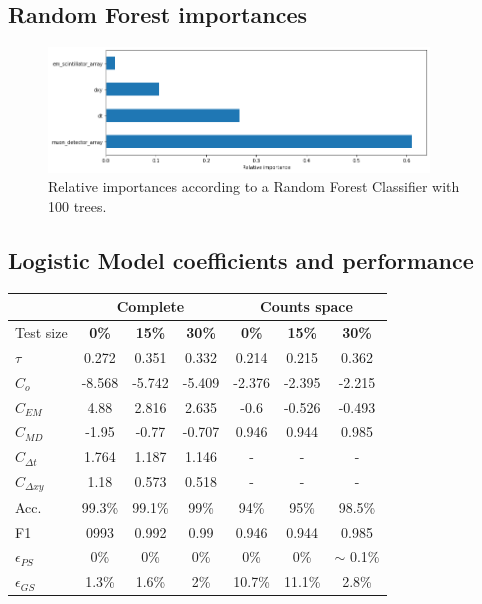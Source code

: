\documentclass{article}
\begin{document}
\begin{appendices}
\subsection{Random Forest importances}
\begin{figure}[!h]
    \centering
    \includegraphics[width=0.9\textwidth]{imgs/importRF.png}
    \caption{Relative importances according to a Random Forest Classifier with 100 trees.}
    \label{fig:importances}
\end{figure}

\subsection{Logistic Model coefficients and performance}
\begin{table}[!h]
\centering
\begin{tabular}[]{l|ccc|ccc}
\hline
  & \multicolumn{3}{c}{Complete}  & \multicolumn{3}{c}{Counts space} \tabularnewline
\hline
Test size    & \textbf{0\%} &\textbf{15\%} & \textbf{30\%} & \textbf{0\%} & \textbf{15\%} &\textbf{30\%}  \\
  \hline
  $\tau$ & 0.272 &	0.351 &	0.332 & 0.214 &	0.215 &	0.362\\
  $C_o$ &-8.568 &	-5.742	& -5.409 &-2.376	&-2.395 &	-2.215   \\
  $C_{EM}$ & 4.88	& 2.816 &	2.635  & -0.6 &	-0.526 & -0.493  \\
  $C_{MD}$ &  -1.95	& -0.77 &	-0.707 & 0.946 &	0.944 &	0.985  \\
  $C_{\Delta t}$ & 1.764	& 1.187 & 1.146   & - & - & - \\
  $C_{\Delta xy}$ &  1.18 & 0.573 &	0.518 &  - & - & -   \\
  \hline
  Acc.   & 99.3\% &	99.1\% & 99\% & 94\%	& 95\% &	98.5\%     \\
    F1 & 0993 & 0.992 &	0.99 &  0.946 &	0.944 &	0.985 \\
  $\epsilon_{PS}$ &  0\%	& 0\%	& 0\% & 0\% &0\% & $\sim$ 0.1\% \\
    $\epsilon_{GS}$ &  1.3\% &	1.6\% &	2\%  & 10.7\% & 11.1\% & 2.8\% \\
  \hline
  

\end{tabular}
\end{table}
\end{appendices}
\end{document}
